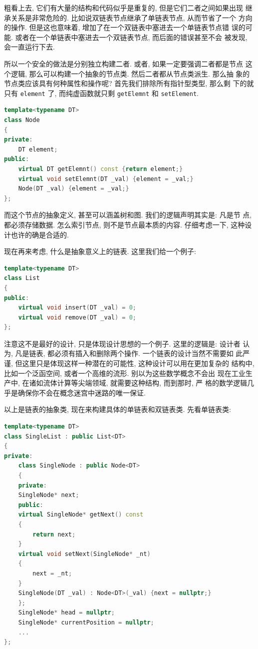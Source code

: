 \documentclass[a4paper]{ctexart}
\theoremstyle{definition}
\theoremstyle{definition}
\begin{document}
粗看上去, 它们有大量的结构和代码似乎是重复的, 但是它们二者之间如果出现
继承关系是非常危险的. 比如说双链表节点继承了单链表节点, 从而节省了一个
方向的操作. 但是这也意味着, 增加了在一个双链表中塞进去一个单链表节点错
误的可能. 或者在一个单链表中塞进去一个双链表节点, 而后面的错误甚至不会
被发现, 会一直运行下去. 

所以一个安全的做法是分别独立构建二者. 或者, 如果一定要强调二者都是节点
这个逻辑, 那么可以构建一个抽象的节点类. 然后二者都从节点类派生. 那么抽
象的节点类应该具有何种属性和操作呢? 首先我们排除所有指针型类型, 那么剩
下的就只有 \verb|element| 了, 而纯虚函数就只剩 \verb|getElemnt| 和
\verb|setElement|.

\begin{lstlisting}[language=C++]
template<typename DT>
class Node
{
private:
    DT element;
public:
    virtual DT getElemnt() const {return element;}
    virtual void setElemnt(DT _val) {element = _val;}
    Node(DT _val) {element = _val;}
};
\end{lstlisting}

而这个节点的抽象定义, 甚至可以涵盖树和图. 我们的逻辑声明其实是: 凡是节
点, 都必须存储数据. 怎么索引节点, 则不是节点最本质的内容. 仔细考虑一下,
这种设计也许的确是合适的.

现在再来考虑, 什么是抽象意义上的链表. 这里我们给一个例子:

\begin{lstlisting}[language=C++]
template<typename DT>
class List
{
public:
    virtual void insert(DT _val) = 0;
    virtual void remove(DT _val) = 0;
};
\end{lstlisting}

注意这不是最好的设计, 只是体现设计思想的一个例子. 这里的逻辑是: 设计者
认为, 凡是链表, 都必须有插入和删除两个操作. 一个链表的设计当然不需要如
此严谨, 但这里只是体现这样一种潜在的可能性, 这种设计可以用在更加复杂的
结构中, 比如一个泛函空间, 或者一个高维的流形. 别以为这些数学概念不会出
现在工业生产中, 在诸如流体计算等尖端领域, 就需要这种结构, 而到那时, 严
格的数学逻辑几乎是确保你不会在概念迷宫中迷路的唯一保证.

以上是链表的抽象类, 现在来构建具体的单链表和双链表类. 先看单链表类:

\begin{lstlisting}[language=C++]
template<typename DT>
class SingleList : public List<DT>
{
private:
    class SingleNode : public Node<DT>
    {
    private:
	SingleNode* next;
    public:
	virtual SingleNode* getNext() const
	{
	    return next;
	}
	virtual void setNext(SingleNode* _nt)
	{
	    next = _nt;
	}
	SingleNode(DT _val) : Node<DT>(_val) {next = nullptr;}
    };
    SingleNode* head = nullptr;
    SingleNode* currentPosition = nullptr;
    ...
};
\end{lstlisting}
\end{document}
